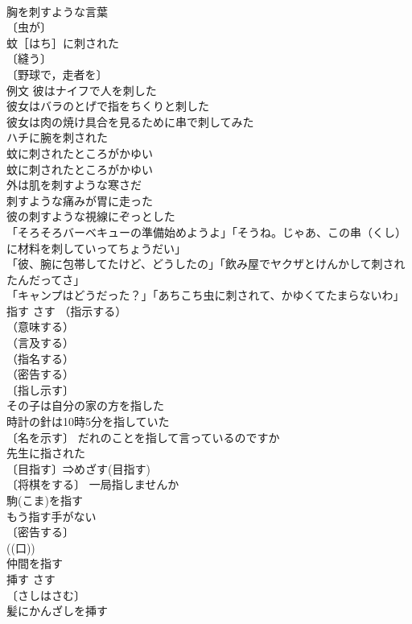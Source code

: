 \documentclass[8pt]{extreport}
\begin{document}
\begin{CJK}{UTF8}{min}
\\	胸を刺すような言葉 
\\	〔虫が〕
\\	蚊［はち］に刺された 
\\	〔縫う〕
\\	〔野球で，走者を〕
\\	例文 彼はナイフで人を刺した 
\\	彼女はバラのとげで指をちくりと刺した 
\\	彼女は肉の焼け具合を見るために串で刺してみた 
\\	ハチに腕を刺された 
\\	蚊に刺されたところがかゆい 
\\	蚊に刺されたところがかゆい 
\\	外は肌を刺すような寒さだ 
\\	刺すような痛みが胃に走った 
\\	彼の刺すような視線にぞっとした 
\\	「そろそろバーベキューの準備始めようよ」「そうね。じゃあ、この串（くし）に材料を刺していってちょうだい」 
\\	「彼、腕に包帯してたけど、どうしたの」「飲み屋でヤクザとけんかして刺されたんだってさ」 
\\	「キャンプはどうだった？」「あちこち虫に刺されて、かゆくてたまらないわ」 
\\	指す	さす	（指示する）
\\	（意味する）
\\	（言及する）
\\	（指名する）
\\	（密告する）
\\	〔指し示す〕
\\	その子は自分の家の方を指した 
\\	時計の針は10時5分を指していた 
\\	〔名を示す〕 だれのことを指して言っているのですか 
\\	先生に指された 
\\	〔目指す〕⇒めざす(目指す) 
\\	〔将棋をする〕 一局指しませんか 
\\	駒(こま)を指す 
\\	もう指す手がない 
\\	〔密告する〕
\\	((口)) 
\\	仲間を指す 
\\	挿す	さす	
\\	〔さしはさむ〕
\\	髪にかんざしを挿す 

\end{CJK}
\end{document}
